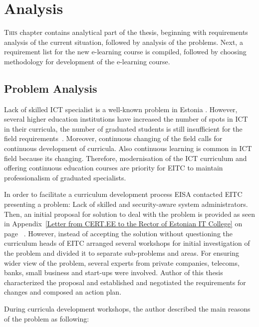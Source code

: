 \chapter{Analysis}
\label{analysis}

\lettrine[lraise=0.1, nindent=0em, slope=-.5em]{\color{Violet}T}{his} chapter contains analytical part of the thesis, beginning with requirements analysis of the current situation, followed by analysis of the problems. Next, a requirement list for the new e-learning course  is compiled, followed by choosing methodology for development of the e-learning course. 

\section{Problem Analysis}
\label{Problem Analysis}


Lack of skilled \gls{ICT} specialist is a well-known problem in Estonia \citep{website:ict_puudu, website:ict_needs}. However, several higher education institutions have increased the number of spots in \gls{ICT} in their curricula, the number of graduated students is still insufficient for the field requirements~\citep{website:TU_ict,website:itc_facts}. Moreover,  continuous changing of the field calls for continuous development of curricula. Also continuous learning is common in \gls{ICT} field because its changing. Therefore, modernisation of the  \gls{ICT} curriculum and offering continuous education courses are priority for \gls{EITC} to maintain professionalism of graduated specialists.

In order to facilitate a curriculum development process \gls{EISA} contacted \gls{EITC} presenting a problem: Lack of skilled and security-aware system administrators. Then, an initial proposal for solution to deal with the problem is provided as seen in Appendix~\ref{Letter from CERT.EE to the Rector of Estonian IT College} on page ~\pageref{Letter from CERT.EE to the Rector of Estonian IT College}. However, instead of accepting the solution without questioning the curriculum heads of \gls{EITC} arranged several workshops for initial investigation of the problem and divided it to separate sub-problems and areas. For ensuring wider view of the problem, several experts from private companies, telecoms, banks, small business and start-ups were involved. Author of this thesis characterized the proposal and established and negotiated the requirements for changes and composed an action plan.

During curricula development workshops, the author described the main reasons of the problem as following:

